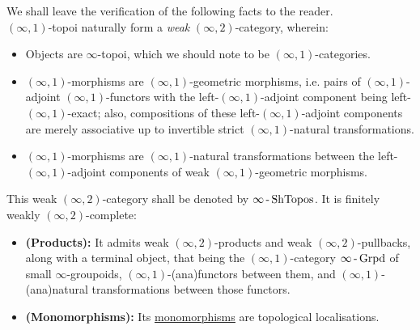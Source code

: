                 \begin{remark} \label{remark: (infinity, 1)_topoi_categories}  
                    We shall leave the verification of the following facts to the reader.
                    \\
                    $(\infty, 1)$-topoi naturally form a \textit{weak} $(\infty, 2)$-category, wherein:
                        \begin{itemize}
                            \item Objects are $\infty$-topoi, which we should note to be $(\infty, 1)$-categories.
                            \item $(\infty, 1)$-morphisms are $(\infty, 1)$-geometric morphisms, i.e. pairs of $(\infty, 1)$-adjoint $(\infty, 1)$-functors with the left-$(\infty, 1)$-adjoint component being left-$(\infty, 1)$-exact; also, compositions of these left-$(\infty, 1)$-adjoint components are merely associative up to invertible strict $(\infty, 1)$-natural transformations.
                            \item $(\infty, 1)$-morphisms are $(\infty, 1)$-natural transformations between the left-$(\infty, 1)$-adjoint components of weak $(\infty, 1)$-geometric morphisms. 
                        \end{itemize}
                    This weak $(\infty, 2)$-category shall be denoted by $\infty\operatorname{-}\mathrm{Sh}\mathrm{Topos}$. It is finitely weakly $(\infty, 2)$-complete:
                        \begin{itemize}
                            \item \textbf{(Products):} It admits weak $(\infty, 2)$-products and weak $(\infty, 2)$-pullbacks, along with a terminal object, that being the $(\infty, 1)$-category $\infty\operatorname{-}\mathrm{Grpd}$ of small $\infty$-groupoids, $(\infty, 1)$-(ana)functors between them, and $(\infty, 1)$-(ana)natural transformations between those functors. 
                            \item \textbf{(Monomorphisms):} Its \href{https://ncatlab.org/nlab/show/monomorphism+in+an+\%28infinity\%2C1\%29-category}{\underline{monomorphisms}} are topological localisations.
                        \end{itemize}
                \end{remark}
        
